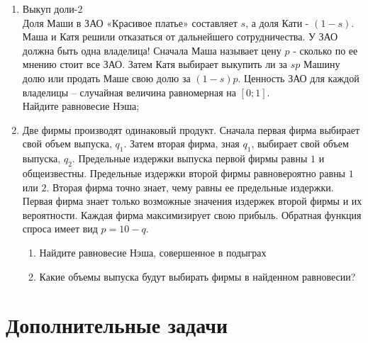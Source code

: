 \documentclass[pdftex,12pt,a4paper]{article}
\begin{document}
\begin{enumerate}
\item Выкуп доли-2\\
Доля Маши в ЗАО «Красивое платье» составляет $s$, а доля Кати - $\left( {1 - s} \right)$. Маша и Катя решили отказаться от дальнейшего сотрудничества. У ЗАО должна быть одна владелица! Сначала Маша называет цену $p$ - сколько по ее мнению стоит все ЗАО. Затем Катя выбирает выкупить ли за $sp$ Машину долю или продать Маше свою долю за $\left( {1 - s} \right)p$. 
Ценность ЗАО для каждой владелицы – случайная величина равномерная на $\left[ {0;1} \right]$.\\
Найдите равновесие Нэша;

\item Две фирмы производят одинаковый продукт. Сначала первая фирма выбирает свой объем выпуска, $q_1$. Затем вторая фирма, зная $q_1$, выбирает свой объем выпуска, $q_2$. Предельные издержки выпуска первой фирмы равны $1$ и общеизвестны. Предельные издержки второй фирмы равновероятно равны $1$ или $2$. Вторая фирма точно знает, чему равны ее предельные издержки. Первая фирма знает только возможные значения издержек второй фирмы и их вероятности. Каждая фирма максимизирует свою прибыль. Обратная функция спроса имеет вид $p=10-q$. 
\begin{enumerate}
\item Найдите равновесие Нэша, совершенное в подыграх
\item Какие объемы выпуска будут выбирать фирмы в найденном равновесии?
\end{enumerate}

\end{enumerate}

\section{Дополнительные задачи}
\end{document}
